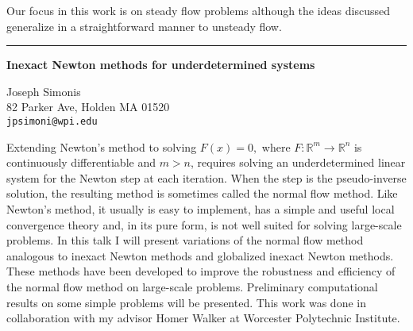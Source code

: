 \documentclass[twosided]{report}
\newcommand{\Reals}{\mathbb{R}}
\begin{document}
Our focus in this
work is on steady flow problems although the ideas discussed
generalize in a straightforward manner to unsteady flow.


	\begin{center} \rule{6in}{1pt} \end{center}

\begin{center}
{\large			%
{\bf Inexact Newton methods for underdetermined systems}}

	Joseph Simonis \\
	82 Parker Ave,  Holden MA 01520 \\
	{\tt jpsimoni@wpi.edu}
\end{center}
Extending Newton's method to solving $F(x)=0,$ where
$F:\Reals^m\rightarrow\Reals^n$ is continuously
differentiable and $m>n$, requires solving an
underdetermined linear system for the Newton step at each
iteration. When the step is the pseudo-inverse solution, the
resulting method is sometimes called the normal flow method.
Like Newton's method, it usually is easy to implement, has a
simple and useful local convergence theory and, in its pure
form, is not well suited for solving large-scale problems.
In this talk I will present variations of the normal flow
method analogous to inexact Newton methods and globalized
inexact Newton methods. These methods have been developed to
improve the robustness and efficiency of the normal flow
method on large-scale problems. Preliminary computational
results on some simple problems will be presented. This work
was done in collaboration with my advisor Homer Walker at
Worcester Polytechnic Institute.
\end{document}
